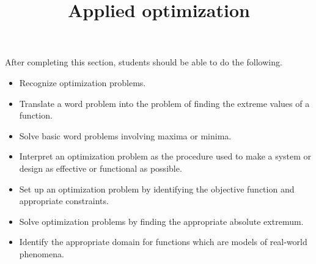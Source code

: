 \documentclass{ximera}
\title{Applied optimization}
\begin{document}
\begin{abstract}
\end{abstract}

\maketitle

\begin{sectionOutcomes}

After completing this section, students should be able to do the following.

\begin{itemize}
\item Recognize optimization problems.
\item Translate a word problem into the problem of finding the extreme values of a function.
\item Solve basic word problems involving maxima or minima.
\item Interpret an optimization problem as the procedure used to make a system or design as effective or functional as possible.
\item Set up an optimization problem by identifying the objective function and appropriate constraints.
\item Solve optimization problems by finding the appropriate absolute extremum.
\item Identify the appropriate domain for functions which are models of real-world phenomena.   
\end{itemize}

\end{sectionOutcomes}
\end{document}
